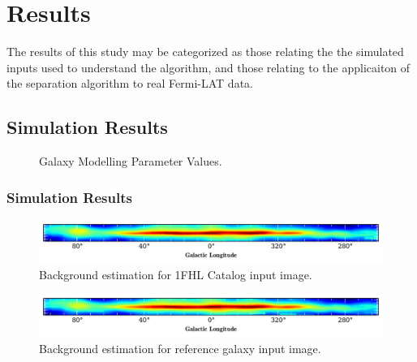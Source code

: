 \documentclass{PoS}
\begin{document}
\section{Results}

The results of this study may be categorized as those relating the the simulated inputs used to understand the algorithm, and those relating to the applicaiton of the separation algorithm to real Fermi-LAT data.

\subsection{Simulation Results}

\begin{figure}
\centering
{}
\caption{Galaxy Modelling Parameter Values.}
\end{figure}

\subsubsection{Simulation Results}

\begin{figure}
  \begin{center}
      \includegraphics[width=\textwidth]{figures/BG_1FHL.pdf}
  \caption{Background estimation for 1FHL Catalog input image.}
  \end{center}
\end{figure}

\begin{figure}
  \begin{center}
      \includegraphics[width=\textwidth]{figures/BG_SIM1.pdf}
  \caption{Background estimation for reference galaxy input image.}
  \end{center}
\end{figure}
\end{document}
